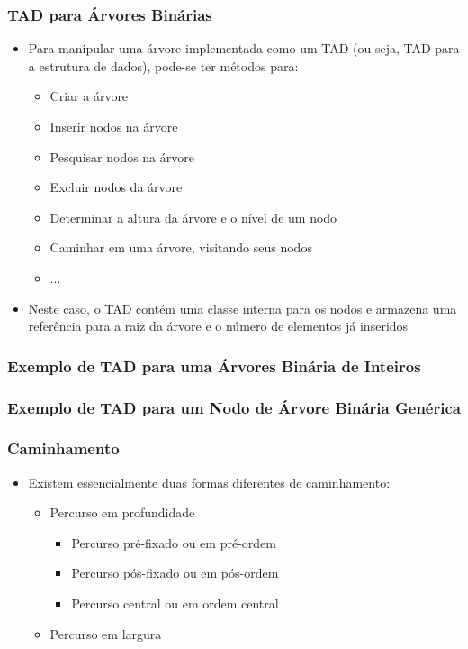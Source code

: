 \documentclass[aspectratio=169]{beamer}
\begin{document}
\begin{frame}\frametitle{TAD para Árvores Binárias}
\begin{itemize}
	\item Para manipular uma árvore implementada como um TAD (ou seja, TAD para a estrutura de dados), pode-se ter métodos para:
	\begin{itemize}
		\item Criar a árvore
		\item Inserir nodos na árvore
		\item Pesquisar nodos na árvore
		\item Excluir nodos da árvore
		\item Determinar a altura da árvore e o nível de um nodo
		\item Caminhar em uma árvore, visitando seus nodos
		\item ...
	\end{itemize}
	\item Neste caso, o TAD contém uma classe interna para os nodos e armazena uma referência para a raiz da árvore e o número de elementos já inseridos
\end{itemize}
\end{frame}

\begin{frame}\frametitle{Exemplo de TAD para uma Árvores Binária de Inteiros}
\fontsize{3pt}{5pt}\selectfont{

}
\end{frame}

\begin{frame}[fragile]\frametitle{Exemplo de TAD para um Nodo de Árvore Binária Genérica}
\fontsize{3pt}{5pt}\selectfont{

}
\end{frame}

\begin{frame}\frametitle{Caminhamento}
\begin{itemize}
	\item Existem essencialmente duas formas diferentes de caminhamento:
	\begin{itemize}
		\item Percurso em profundidade
		\begin{itemize}
			\item Percurso pré-fixado ou em pré-ordem
			\item Percurso pós-fixado ou em pós-ordem
			\item Percurso central ou em ordem central
		\end{itemize}
		\item Percurso em largura
	\end{itemize}
\end{itemize}
\end{frame}
\end{document}
